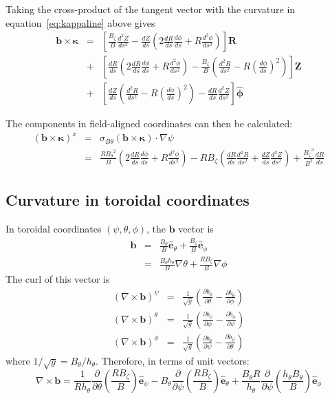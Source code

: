 \documentclass[12pt]{article}
\newcommand{\sbt}{\ensuremath{\sigma_{B\theta}}}
\newcommand{\dd}[2]{\ensuremath{\frac{d #1}{d #2}}}
\newcommand{\ddd}[2]{\ensuremath{\frac{d^2 #1}{d #2^2}}}
\newcommand{\deriv}[2]{\ensuremath{\frac{\partial #1}{\partial #2}}}
\newcommand{\hthe}{\ensuremath{h_\theta}}
\newcommand{\Bp}{\ensuremath{B_\theta}}
\newcommand{\Bt}{\ensuremath{B_\zeta}}
\newcommand{\Vec}[1]{\ensuremath{\mathbf{#1}}}
\newcommand{\bvec}{\Vec{b}}
\newcommand{\kvec}{\Vec{\kappa}}
\newcommand{\phivec}{\ensuremath{\hat{\Vec{\phi}}}}
\newcommand{\ehat}{\ensuremath{\hat{\Vec{e}}}}
\begin{document}
Taking the cross-product of the tangent vector with the curvature in equation~\ref{eq:kappaline} above gives
\begin{eqnarray*}
  \bvec \times\kvec &=& \left[\frac{\Bt}{B}\ddd{Z}{s} - \dd{Z}{s}\left(2\dd{R}{s}\dd{\phi}{s} + R\ddd{\phi}{s}\right)\right]\Vec{R} \\
  &+& \left[\dd{R}{s}\left(2\dd{R}{s}\dd{\phi}{s} + R\ddd{\phi}{s}\right) - \frac{\Bt}{B}\left(\ddd{R}{s} - R\left(\dd{\phi}{s}\right)^2\right)\right]\Vec{Z} \\
  &+& \left[\dd{Z}{s}\left(\ddd{R}{s} - R\left(\dd{\phi}{s}\right)^2\right) - \dd{R}{s}\ddd{Z}{s}\right]\phivec
\end{eqnarray*}

The components in field-aligned coordinates can then be calculated:
\begin{eqnarray*}
\left(\bvec\times\kvec\right)^x &=& \sbt\left(\bvec\times\kvec\right)\cdot\nabla\psi \\
&=& \frac{R\Bp^2}{B}\left(2\dd{R}{s}\dd{\phi}{s} + R\ddd{\phi}{s}\right) - R\Bt\left(\dd{R}{s}\ddd{R}{s} + \dd{Z}{s}\ddd{Z}{s}\right) + \frac{\Bt^3}{B^2}\dd{R}{s}
\end{eqnarray*}

\subsection{Curvature in toroidal coordinates}

In toroidal coordinates $\left(\psi,\theta,\phi\right)$, the $\bvec$ vector
is
\begin{eqnarray*}
\bvec &=& \frac{\Bp}{B}\ehat_\theta + \frac{\Bt}{B}\ehat_\phi \\
&=& \frac{\Bp\hthe}{B}\nabla\theta + \frac{R\Bt}{B}\nabla\phi
\end{eqnarray*}
The curl of this vector is
\begin{eqnarray*}
\left(\nabla\times\bvec\right)^\psi &=& \frac{1}{\sqrt{g}}\left(\deriv{b_\phi}{\theta} - \deriv{b_\theta}{\phi}\right) \\
\left(\nabla\times\bvec\right)^\theta &=& \frac{1}{\sqrt{g}}\left(\deriv{b_\psi}{\phi} - \deriv{b_\phi}{\psi}\right) \\
\left(\nabla\times\bvec\right)^\phi &=& \frac{1}{\sqrt{g}}\left(\deriv{b_\theta}{\psi} - \deriv{b_\psi}{\theta}\right)
\end{eqnarray*}
where $1/\sqrt{g} = \Bp/\hthe$. Therefore, in terms of unit vectors:
\[
\nabla\times\bvec = \frac{1}{R\hthe}\deriv{}{\theta}\left(\frac{R\Bt}{B}\right)\ehat_\psi - \Bp\deriv{}{\psi}\left(\frac{R\Bt}{B}\right)\ehat_\theta + \frac{\Bp R}{\hthe}\deriv{}{\psi}\left(\frac{\hthe\Bp}{B}\right)\ehat_\phi
\]
\end{document}
